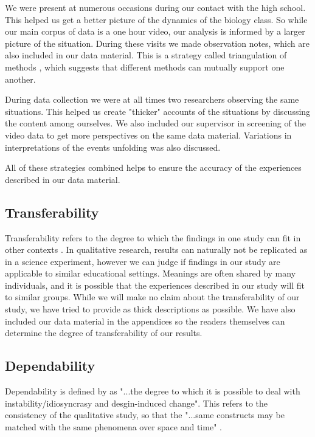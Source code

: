 We were present at numerous occasions during our contact with the high school. This helped us get a better picture of the dynamics of the biology class. So while our main corpus of data is a one hour video, our analysis is informed by a larger picture of the situation. During these visits we made observation notes, which are also included in our data material. This is a strategy called triangulation of methods \citep{baxter1997evaluating}, which suggests that different methods can mutually support one another. 

During data collection we were at all times two researchers observing the same situations. This helped us create "thicker" \citep{geertz1973interpretation} accounts of the situations by discussing the content among ourselves. We also included our supervisor in screening of the video data to get more perspectives on the same data material. Variations in interpretations of the events unfolding was also discussed.

All of these strategies combined helps to ensure the accuracy of the experiences described in our data material. 

\subsection{Transferability}
Transferability refers to the degree to which the findings in one study can fit in other contexts \citep{baxter1997evaluating}. In qualitative research, results can naturally not be replicated as in a science experiment, however we can judge if findings in our study are applicable to similar educational settings. Meanings are often shared by many individuals, and it is possible that the experiences described in our study will fit to similar groups. 
While we will make no claim about the transferability of our study, we have tried to provide as thick descriptions as possible. We have also included our data material in the appendices so the readers themselves can determine the degree of transferability of our results. 

\subsection{Dependability}
Dependability is defined by \citet{baxter1997evaluating} as "...the degree to which it is possible to deal with instability/idiosyncrasy and desgin-induced change". This refers to the consistency of the qualitative study, so that the "...same constructs may be matched with the same phenomena over space and time" \citep{baxter1997evaluating}. 

